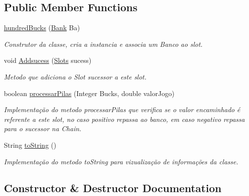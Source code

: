 \subsection*{Public Member Functions}
\begin{DoxyCompactItemize}
\item 
\mbox{\hyperlink{classchain_of_responsability_pattern_1_1hundred_bucks_a0ac492d32247e90bb0f72366cd8e65ec}{hundred\+Bucks}} (\mbox{\hyperlink{classmediator_pattern_1_1_bank}{Bank}} Ba)
\begin{DoxyCompactList}\small\item\em Construtor da classe, cria a instancia e associa um Banco ao slot. \end{DoxyCompactList}\item 
void \mbox{\hyperlink{classchain_of_responsability_pattern_1_1hundred_bucks_a4bacbb9fbd8e7c3d6fef720b52368add}{Addsucess}} (\mbox{\hyperlink{interfacechain_of_responsability_pattern_1_1_slots}{Slots}} sucess)
\begin{DoxyCompactList}\small\item\em Metodo que adiciona o Slot sucessor a este slot. \end{DoxyCompactList}\item 
boolean \mbox{\hyperlink{classchain_of_responsability_pattern_1_1hundred_bucks_adef35c81f1111468fc8a3de01512b85e}{processar\+Pilas}} (Integer Bucks, double valor\+Jogo)
\begin{DoxyCompactList}\small\item\em Implementação do metodo processar\+Pilas que verifica se o valor encaminhado é referente a este slot, no caso positivo repassa ao banco, em caso negativo repassa para o sucessor na Chain. \end{DoxyCompactList}\item 
String \mbox{\hyperlink{classchain_of_responsability_pattern_1_1hundred_bucks_a58cfa32d43b172c490f25603060e4dde}{to\+String}} ()
\begin{DoxyCompactList}\small\item\em Implementação do metodo to\+String para vizualização de informações da classe. \end{DoxyCompactList}\end{DoxyCompactItemize}


\subsection{Constructor \& Destructor Documentation}
\mbox{\label{classchain_of_responsability_pattern_1_1hundred_bucks_a0ac492d32247e90bb0f72366cd8e65ec}} 
